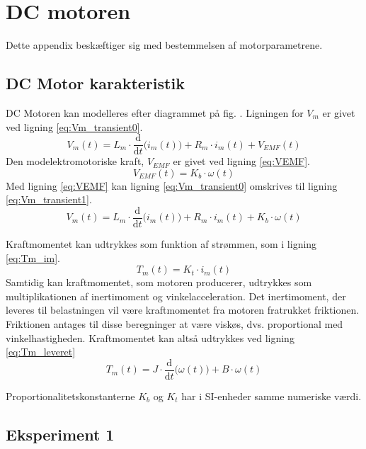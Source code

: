 \section{DC motoren}
Dette appendix beskæftiger sig med bestemmelsen af motorparametrene.
\subsection{DC Motor karakteristik}
DC Motoren kan modelleres efter diagrammet på fig. .
Ligningen for $V_m$ er givet ved ligning \ref{eq:Vm_transient0}.
\begin{equation}
	V_m(t)=L_m \cdot \frac{\mathrm d}{\mathrm d t} \big( i_m(t) \big)+R_m \cdot i_m(t) + V_{EMF}(t)
	\label{eq:Vm_transient0} 
 \end{equation}
Den modelektromotoriske kraft, $V_{EMF}$ er givet ved ligning \ref{eq:VEMF}.
\begin{equation}
	V_{EMF}(t) = K_b \cdot \omega(t)
	\label{eq:VEMF}
\end{equation}
Med ligning \ref{eq:VEMF} kan ligning \ref{eq:Vm_transient0} omskrives til ligning \ref{eq:Vm_transient1}.
\begin{equation}
	V_m(t)=L_m \cdot \frac{\mathrm d}{\mathrm d t} \big( i_m(t) \big)+R_m \cdot i_m(t) +K_b \cdot \omega(t)
	\label{eq:Vm_transient1} 
 \end{equation}

Kraftmomentet kan udtrykkes som funktion af strømmen, som i ligning \ref{eq:Tm_im}.
\begin{equation}
	T_m(t)=K_t\cdot{i_m(t)}
	\label{eq:Tm_im} 
 \end{equation}
Samtidig kan kraftmomentet, som motoren producerer, udtrykkes som multiplikationen af inertimoment og vinkelacceleration.
Det inertimoment, der leveres til belastningen vil være kraftmomentet fra motoren fratrukket friktionen.
Friktionen antages til disse beregninger at være viskøs, dvs. proportional med vinkelhastigheden.
Kraftmomentet kan altså udtrykkes ved ligning \ref{eq:Tm_leveret}
\begin{equation}
	T_m(t)=J\cdot\frac{\mathrm d}{\mathrm d t} \big(\omega(t) \big)+B\cdot\omega(t)
	\label{eq:Tm_leveret} 
 \end{equation}

Proportionalitetskonstanterne $K_b$ og $K_t$ har i SI-enheder samme numeriske værdi.

\subsection{Eksperiment 1}
\label{ss:eksperiment1}
